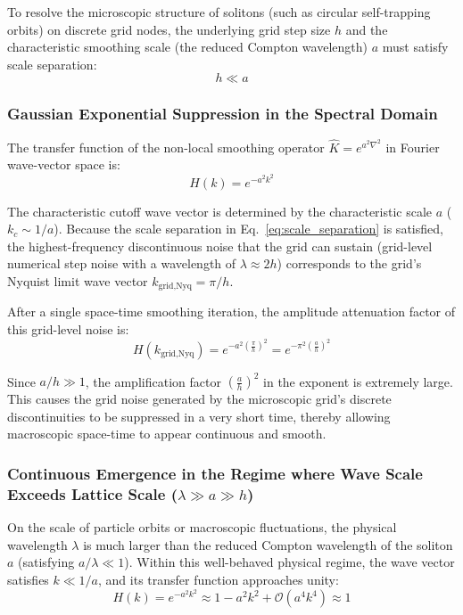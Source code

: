 \documentclass[12pt, a4paper]{article}
\begin{document}
To resolve the microscopic structure of solitons (such as circular self-trapping orbits) on discrete grid nodes, the underlying grid step size $h$ and the characteristic smoothing scale (the reduced Compton wavelength) $a$ must satisfy scale separation:
\begin{equation}
\label{eq:scale_separation}
h \ll a
\end{equation}

\subsubsection{Gaussian Exponential Suppression in the Spectral Domain}

The transfer function of the non-local smoothing operator $\hat{K} = e^{a^2 \nabla^2}$ in Fourier wave-vector space is:
\begin{equation}
\label{eq:transfer_function}
H(k) = e^{-a^2 k^2}
\end{equation}

The characteristic cutoff wave vector is determined by the characteristic scale $a$ ($k_c \sim 1/a$). Because the scale separation in Eq.~\eqref{eq:scale_separation} is satisfied, the highest-frequency discontinuous noise that the grid can sustain (grid-level numerical step noise with a wavelength of $\lambda \approx 2h$) corresponds to the grid's Nyquist limit wave vector $k_{\text{grid,Nyq}} = \pi/h$.

After a single space-time smoothing iteration, the amplitude attenuation factor of this grid-level noise is:
\begin{equation}
\label{eq:nyquist_suppression}
H(k_{\text{grid,Nyq}}) = e^{-a^2 \left(\frac{\pi}{h}\right)^2} = e^{-\pi^2 \left(\frac{a}{h}\right)^2}
\end{equation}

Since $a/h \gg 1$, the amplification factor $\left(\frac{a}{h}\right)^2$ in the exponent is extremely large. This causes the grid noise generated by the microscopic grid's discrete discontinuities to be suppressed in a very short time, thereby allowing macroscopic space-time to appear continuous and smooth.

\subsubsection{Continuous Emergence in the Regime where Wave Scale Exceeds Lattice Scale ($\lambda \gg a \gg h$)}

On the scale of particle orbits or macroscopic fluctuations, the physical wavelength $\lambda$ is much larger than the reduced Compton wavelength of the soliton $a$ (satisfying $a/\lambda \ll 1$). Within this well-behaved physical regime, the wave vector satisfies $k \ll 1/a$, and its transfer function approaches unity:
\begin{equation}
\label{eq:macroscopic_transfer}
H(k) = e^{-a^2 k^2} \approx 1 - a^2 k^2 + \mathcal{O}(a^4 k^4) \approx 1
\end{equation}
\end{document}
